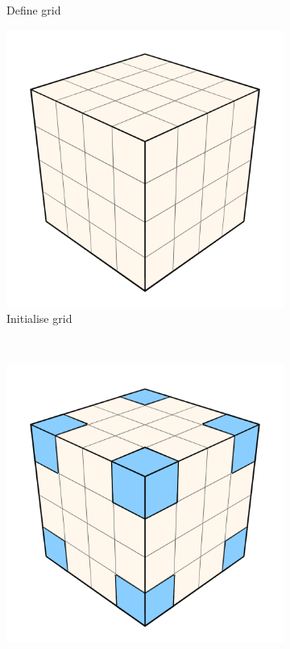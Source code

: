 \begin{figure}[t]
\begin{subfigure}[b]{.3\linewidth}
    \caption{\footnotesize Define grid}%
    \label{fig:hs-p1b}%
  \end{subfigure}
  \begin{subfigure}[b]{.3\linewidth}
    \includegraphics[width=\textwidth]{./img/raw/hs-slt-algorithm/hs-slt-algorithm-3.png}%
    \caption{\footnotesize Initialise grid}%
    \label{fig:hs-p1c}%
  \end{subfigure}
  \\
  \begin{subfigure}[b]{.3\linewidth}
    \includegraphics[width=\textwidth]{./img/raw/hs-slt-algorithm/hs-slt-algorithm-4.png}%

\end{subfigure}
\end{figure}
